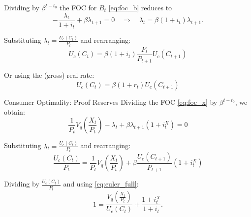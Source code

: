 \documentclass[11pt,aspectratio=169]{beamer}
\begin{document}
\begin{frame}
Dividing by $\beta^{t-t_0}$ the FOC for \(B_t\) \eqref{eq:foc_b} reduces to
\begin{equation}
- \frac{\lambda_t}{1+i_t} + \beta \lambda_{t+1} = 0 \quad \Rightarrow \quad \lambda_t = \beta (1+i_t) \lambda_{t+1}.
\end{equation}

Substituting \(\lambda_t = \frac{U_c(C_t)}{P_t}\) and rearranging:  
\begin{equation} 
U_c(C_t) = \beta (1+i_t) \frac{P_t}{P_{t+1}}U_c(C_{t+1}) \label{eq:euler_full} 
\end{equation}

Or using the (gross) real rate:
\begin{equation} \label{eq:euler_final}
U_c(C_t) = \beta (1+r_t)U_c(C_{t+1})
\end{equation}
\vspace{0.2cm}
\begin{center}
\hyperlink{euler}{}
\end{center}
\end{frame}

\begin{frame}[label=liq_proof]{Consumer Optimality: Proof Reserves}
Dividing the FOC \eqref{eq:foc_x} by $\beta^{t-t_0}$, we obtain: 
\begin{equation}
\frac{1}{P_t}V_q\left(\frac{X_t}{P_t}\right) - \lambda_t + \beta\lambda_{t+1}(1+i_t^X)  = 0
\end{equation}

Substituting \(\lambda_t = \frac{U_c(C_t)}{P_t}\) and rearranging:  
\begin{equation} 
\frac{U_c(C_t)}{P_t}= \frac{1}{P_t}V_q\left(\frac{X_t}{P_t}\right) + \beta\frac{U_c(C_{t+1})}{P_{t+1}}(1+i_t^X) 
\end{equation}

Dividing by $\frac{U_c(C_t)}{P_t}$ and using \eqref{eq:euler_full}:
\begin{equation} 
1=\frac{V_q\!\left(\frac{X_t}{P_t}\right)}{U_c(C_t)}
+\frac{1+i_t^{X}}{1+i_t}.
\end{equation}
\begin{center}
\hyperlink{liquidity}{}
\end{center}
\end{frame}
\end{document}
